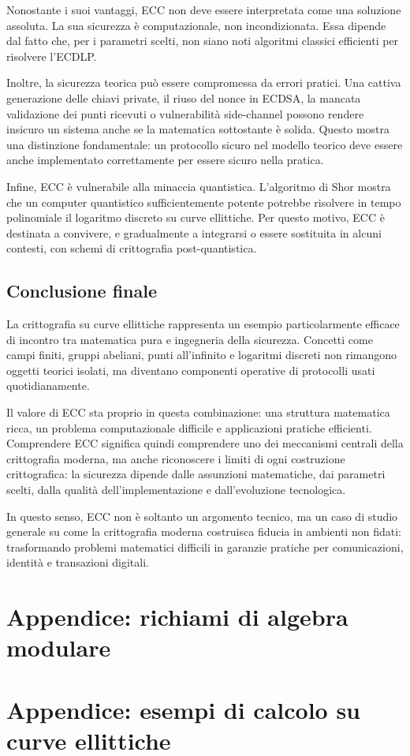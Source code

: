 \documentclass[12pt,a4paper,oneside]{report}
\begin{document}
Nonostante i suoi vantaggi, ECC non deve essere interpretata come una soluzione assoluta. La sua sicurezza è computazionale, non incondizionata. Essa dipende dal fatto che, per i parametri scelti, non siano noti algoritmi classici efficienti per risolvere l'ECDLP.

Inoltre, la sicurezza teorica può essere compromessa da errori pratici. Una cattiva generazione delle chiavi private, il riuso del nonce in ECDSA, la mancata validazione dei punti ricevuti o vulnerabilità side-channel possono rendere insicuro un sistema anche se la matematica sottostante è solida. Questo mostra una distinzione fondamentale: un protocollo sicuro nel modello teorico deve essere anche implementato correttamente per essere sicuro nella pratica.

Infine, ECC è vulnerabile alla minaccia quantistica. L'algoritmo di Shor mostra che un computer quantistico sufficientemente potente potrebbe risolvere in tempo polinomiale il logaritmo discreto su curve ellittiche. Per questo motivo, ECC è destinata a convivere, e gradualmente a integrarsi o essere sostituita in alcuni contesti, con schemi di crittografia post-quantistica.

\section{Conclusione finale}

La crittografia su curve ellittiche rappresenta un esempio particolarmente efficace di incontro tra matematica pura e ingegneria della sicurezza. Concetti come campi finiti, gruppi abeliani, punti all'infinito e logaritmi discreti non rimangono oggetti teorici isolati, ma diventano componenti operative di protocolli usati quotidianamente.

Il valore di ECC sta proprio in questa combinazione: una struttura matematica ricca, un problema computazionale difficile e applicazioni pratiche efficienti. Comprendere ECC significa quindi comprendere uno dei meccanismi centrali della crittografia moderna, ma anche riconoscere i limiti di ogni costruzione crittografica: la sicurezza dipende dalle assunzioni matematiche, dai parametri scelti, dalla qualità dell'implementazione e dall'evoluzione tecnologica.

In questo senso, ECC non è soltanto un argomento tecnico, ma un caso di studio generale su come la crittografia moderna costruisca fiducia in ambienti non fidati: trasformando problemi matematici difficili in garanzie pratiche per comunicazioni, identità e transazioni digitali.


\appendix
\chapter{Appendice: richiami di algebra modulare}
\chapter{Appendice: esempi di calcolo su curve ellittiche}

\printbibliography
\end{document}
